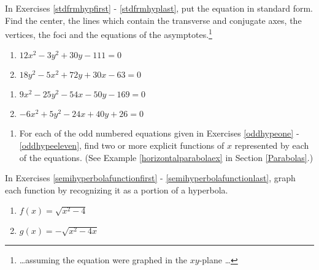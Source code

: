 In Exercises \ref{stdfrmhypfirst} - \ref{stdfrmhyplast}, put the equation in standard form.  Find the center, the lines which contain the transverse and conjugate axes, the vertices, the foci and the equations of the asymptotes.\footnote{ \ldots assuming the equation were graphed in the $xy$-plane \ldots}

\begin{multicols}{2}
\begin{enumerate}
\setcounter{enumi}{\value{HW}}

\item $12x^{2} - 3y^{2} + 30y - 111 = 0$  \label{stdfrmhypfirst}  \label{oddhypenine}
\item $18y^{2} - 5x^{2} +  72y + 30x - 63= 0$

\setcounter{HW}{\value{enumi}}
\end{enumerate}
\end{multicols}

\begin{multicols}{2}
\begin{enumerate}
\setcounter{enumi}{\value{HW}}
 
\item $9x^2-25y^2-54x-50y-169 = 0$  \label{oddhypeeleven}
\item $-6x^2+5y^2-24x+40y+26=0$  \label{stdfrmhyplast}

\setcounter{HW}{\value{enumi}}
\end{enumerate}
\end{multicols}

\begin{enumerate}
\setcounter{enumi}{\value{HW}}

\item For each of the odd numbered equations given in Exercises \ref{oddhypeone} - \ref{oddhypeeleven}, find two or more explicit functions of $x$ represented by each of the equations.  (See Example \ref{horizontalparabolaex} in Section \ref{Parabolas}.)

\setcounter{HW}{\value{enumi}}
\end{enumerate}

In Exercises \ref{semihyperbolafunctionfirst} - \ref{semihyperbolafunctionlast}, graph each function by recognizing it as a portion of a hyperbola.

\begin{multicols}{2}
\begin{enumerate}
\setcounter{enumi}{\value{HW}}

\item   $f(x) = \sqrt{x^2-4}$ \label{semihyperbolafunctionfirst}
\item   $g(x) = -\sqrt{x^2-4x}$

\setcounter{HW}{\value{enumi}}
\end{enumerate}
\end{multicols}

